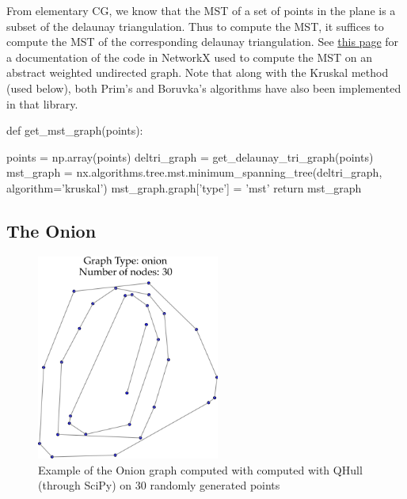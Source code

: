 From elementary CG, we know that the MST of a set of points in the plane is a subset of the delaunay triangulation. Thus to compute the MST,
it suffices to compute the MST of the corresponding delaunay triangulation. 
See \href{https://networkx.github.io/documentation/stable/reference/algorithms/generated/networkx.algorithms.tree.mst.minimum_spanning_edges.html}{this page}
for a documentation of the code in NetworkX used to compute the MST on an abstract weighted undirected graph. Note that along with the Kruskal method (used below), both Prim's and Boruvka's 
algorithms have also been implemented in that library. 

\nwenddocs{}\plusendmoddef\nwstartdeflinemarkup{}\nwenddeflinemarkup

def get_mst_graph(points):

     points = np.array(points)
     deltri_graph = get_delaunay_tri_graph(points)
     mst_graph = nx.algorithms.tree.mst.minimum_spanning_tree(deltri_graph, \\
                                                              algorithm='kruskal')
     mst_graph.graph['type']   = 'mst'
     return mst_graph
\nwendcode{}\nwdocspar


\subsection{The Onion}

\begin{figure}[H]
  \centering
  \includegraphics[width=6cm]{./miscimages/onion-example.png}
  \caption{\label{fig:onion} Example of the Onion graph computed with computed with QHull (through SciPy) on 30 randomly generated points }
\end{figure}



